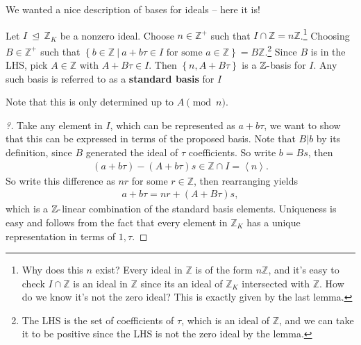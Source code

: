 We wanted a nice description of bases for ideals -- here it is!

\begin{proposition}

Let \(I {~\trianglelefteq~}{\mathbb{Z}}_K\) be a nonzero ideal. Choose
\(n\in {\mathbb{Z}}^+\) such that
\(I \cap{\mathbb{Z}}= n{\mathbb{Z}}\).\footnote{Why does this \(n\)
  exist? Every ideal in \({\mathbb{Z}}\) is of the form
  \(n{\mathbb{Z}}\), and it's easy to check \(I \cap{\mathbb{Z}}\) is an
  ideal in \({\mathbb{Z}}\) since its an ideal of \({\mathbb{Z}}_K\)
  intersected with \({\mathbb{Z}}\). How do we know it's not the zero
  ideal? This is exactly given by the last lemma.} Choosing
\(B \in {\mathbb{Z}}^+\) such that
\(\left\{{ b\in {\mathbb{Z}}{~\mathrel{\Big|}~}a + b \tau\in I \text{ for some } a \in {\mathbb{Z}}}\right\} = B{\mathbb{Z}}\).\footnote{The
  LHS is the set of coefficients of \(\tau\), which is an ideal of
  \({\mathbb{Z}}\), and we can take it to be positive since the LHS is
  not the zero ideal by the lemma.} Since \(B\) is in the LHS, pick
\(A\in {\mathbb{Z}}\) with \(A + B\tau \in I\). Then
\(\left\{{n, A+B\tau}\right\}\) is a \({\mathbb{Z}}{\hbox{-}}\)basis for
\(I\). Any such basis is referred to as a \textbf{standard basis} for
\(I\)

\end{proposition}

\begin{remark}

Note that this is only determined up to \(A \pmod n\).

\end{remark}

\begin{proof}[?]

Take any element in \(I\), which can be represented as \(a + b \tau\),
we want to show that this can be expressed in terms of the proposed
basis. Note that \(B\mathrel{\Big|}b\) by its definition, since \(B\)
generated the ideal of \(\tau\) coefficients. So write \(b = Bs\), then
\begin{align*}
( a + b \tau) - (A + b \tau)s \in {\mathbb{Z}}\cap I = \left\langle{ n }\right\rangle 
.\end{align*}
So write this difference as \(nr\) for some \(r\in {\mathbb{Z}}\), then
rearranging yields
\begin{align*}
a + b \tau = nr + (A + B \tau)s
,\end{align*}
which is a \({\mathbb{Z}}{\hbox{-}}\)linear combination of the standard
basis elements. Uniqueness is easy and follows from the fact that every
element in \({\mathbb{Z}}_K\) has a unique representation in terms of
\(1, \tau\).

\end{proof}

